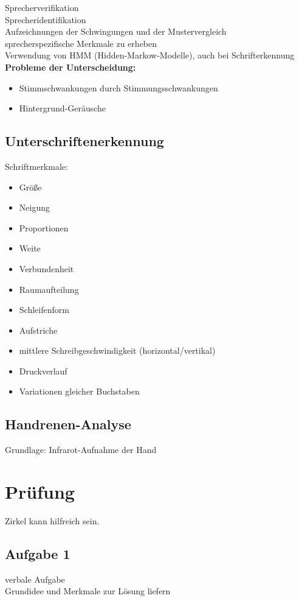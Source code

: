 \documentclass[a4paper,12pt]{scrreprt}
\newcommand{\Nb}[1]{\textbf{#1}}
\begin{document}
Sprecherverifikation\\
Sprecheridentifikation\\

Aufzeichnungen der Schwingungen und der Mustervergleich\\
sprecherspezifische Merkmale zu erheben\\
Verwendung von HMM (Hidden-Markow-Modelle), auch bei Schrifterkennung\\
\Nb{Probleme der Unterscheidung:}
\begin{itemize}
 \item Stimmschwankungen durch Stimmungsschwankungen
 \item Hintergrund-Geräusche
\end{itemize}

\subsection{Unterschriftenerkennung}
Schriftmerkmale:
 \begin{itemize}
 \item Größe
 \item Neigung
 \item Proportionen
 \item Weite
 \item Verbundenheit
 \item Raumaufteilung
 \item Schleifenform
 \item Aufstriche
 \item mittlere Schreibgeschwindigkeit (horizontal/vertikal)
 \item Druckverlauf
 \item Variationen gleicher Buchstaben
\end{itemize}

\subsection{Handrenen-Analyse}

Grundlage: Infrarot-Aufnahme der Hand\\

\section{Prüfung}
Zirkel kann hilfreich sein.\\
\subsection{Aufgabe 1}
verbale Aufgabe\\
Grundidee und Merkmale zur Lösung liefern
\end{document}
